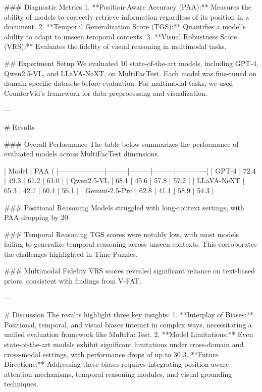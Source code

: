 ### Diagnostic Metrics  
1. **Position-Aware Accuracy (PAA):** Measures the ability of models to correctly retrieve information regardless of its position in a document.
2. **Temporal Generalization Score (TGS):** Quantifies a model's ability to adapt to unseen temporal contexts.
3. **Visual Robustness Score (VRS):** Evaluates the fidelity of visual reasoning in multimodal tasks.

## Experiment Setup  
We evaluated 10 state-of-the-art models, including GPT-4, Qwen2.5-VL, and LLaVA-NeXT, on MultiFacTest. Each model was fine-tuned on domain-specific datasets before evaluation. For multimodal tasks, we used CounterVid's framework for data preprocessing and visualization.

---

# Results  

### Overall Performance  
The table below summarizes the performance of evaluated models across MultiFacTest dimensions.

| Model             | PAA (%
|--------------------|---------|---------|---------|-------------|
| GPT-4             | 72.4    | 49.3    | 61.2    | 61.0        |
| Qwen2.5-VL        | 68.1    | 45.6    | 57.8    | 57.2        |
| LLaVA-NeXT        | 65.3    | 42.7    | 60.4    | 56.1        |
| Gemini-2.5-Pro    | 62.8    | 41.1    | 58.9    | 54.3        |

### Positional Reasoning  
Models struggled with long-context settings, with PAA dropping by 20%

### Temporal Reasoning  
TGS scores were notably low, with most models failing to generalize temporal reasoning across unseen contexts. This corroborates the challenges highlighted in Time Puzzles.

### Multimodal Fidelity  
VRS scores revealed significant reliance on text-based priors, consistent with findings from V-FAT.

---

# Discussion  
The results highlight three key insights:
1. **Interplay of Biases:** Positional, temporal, and visual biases interact in complex ways, necessitating a unified evaluation framework like MultiFacTest.
2. **Model Limitations:** Even state-of-the-art models exhibit significant limitations under cross-domain and cross-modal settings, with performance drops of up to 30%
3. **Future Directions:** Addressing these biases requires integrating position-aware attention mechanisms, temporal reasoning modules, and visual grounding techniques.

